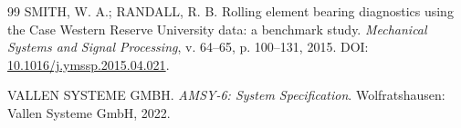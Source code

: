\documentclass[12pt]{article}
\begin{document}
\begin{thebibliography}{99}
	SMITH, W. A.; RANDALL, R. B.
	\newblock Rolling element bearing diagnostics using the Case Western Reserve University data: a benchmark study.
	\newblock \emph{Mechanical Systems and Signal Processing}, v. 64--65, p. 100--131, 2015.
	\newblock DOI: \href{https://doi.org/10.1016/j.ymssp.2015.04.021}{10.1016/j.ymssp.2015.04.021}.

	VALLEN SYSTEME GMBH.
	\newblock \emph{AMSY-6: System Specification}.
	\newblock Wolfratshausen: Vallen Systeme GmbH, 2022.

\end{thebibliography}
\end{document}
